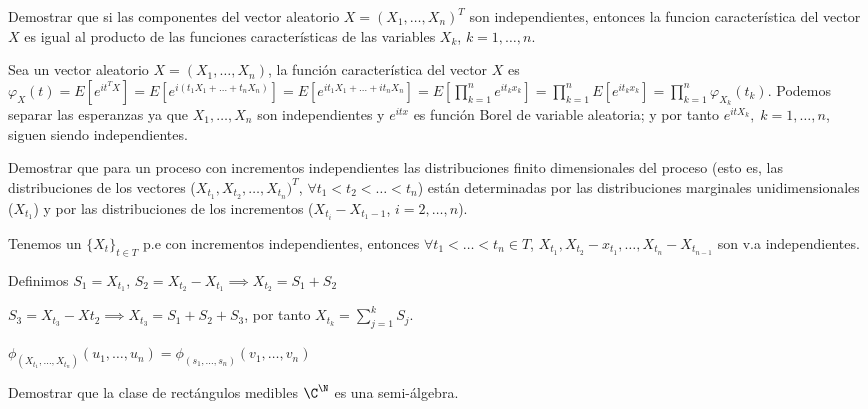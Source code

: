 \begin{ejer}
  Demostrar que si las componentes del vector aleatorio $X = (X_1, \ldots, X_n)^T$ son independientes, entonces la funcion característica del vector $X$ es igual al producto de las funciones características de las variables $X_k$, $k = 1, \ldots, n$.
\end{ejer}

\begin{sol}
  Sea un vector aleatorio $X = (X_1, \ldots, X_n)$, la función característica del vector $X$ es $\varphi_X(t) = E[e^{it^TX}] = E[e^{i(t_1 X_1 + \ldots + t_n X_n)}] = E[e^{i t_1 X_1 + \ldots + i t_n X_n}] = E[\prod \limits^n_{k = 1} e^{i t_k x_k}] = \prod \limits^n_{k = 1} E[e^{i t_k x_k}] = \prod \limits^n_{k = 1} \varphi_{X_k} (t_k)$. Podemos separar las esperanzas ya que $X_1, \ldots, X_n$ son independientes y $e^{itx}$ es función Borel de variable aleatoria; y por tanto $e^{itX_k}, \; k = 1, \ldots, n$, siguen siendo independientes.
\end{sol}

\begin{ejer}
  Demostrar que para un proceso con incrementos independientes las distribuciones finito dimensionales del proceso (esto es, las distribuciones de los vectores ($X_{t_1}, X_{t_2}, \ldots, X_{t_n})^T$, $\forall t_1 < t_2 < \ldots < t_n$) están determinadas por las distribuciones marginales unidimensionales ($X_{t_1}$) y por las distribuciones de los incrementos ($X_{t_i} - X_{t_1 - 1}$, $i = 2, \ldots, n$).
\end{ejer}

\begin{sol}
  Tenemos un $\{X_t\}_{t \in T}$ p.e con incrementos independientes, entonces $\forall t_1 < \ldots < t_n \in T$, $X_{t_1}, X_{t_2} - x_{t_1}, \ldots, X_{t_n} - X_{t_{n-1}}$ son v.a independientes.

  Definimos $S_1 = X_{t_1}$, $S_2 = X_{t_2} - X_{t_1} \implies X_{t_2} = S_1 + S_2$

  $S_3 = X_{t_3} - X{t_2} \implies X_{t_3} = S_1 + S_2 + S_3$, por tanto $X_{t_k} = \sum \limits^k_{j = 1} S_j$.

  $\phi_{(X_{t_1}, \ldots, X_{t_n})}(u_1, \ldots, u_n) = \phi_{(s_1, \ldots, s_n)}(v_1, \ldots, v_n)$

\end{sol}

\begin{ejer}
  Demostrar que la clase de rectángulos medibles $\C^\N$ es una semi-álgebra.
\end{ejer}

